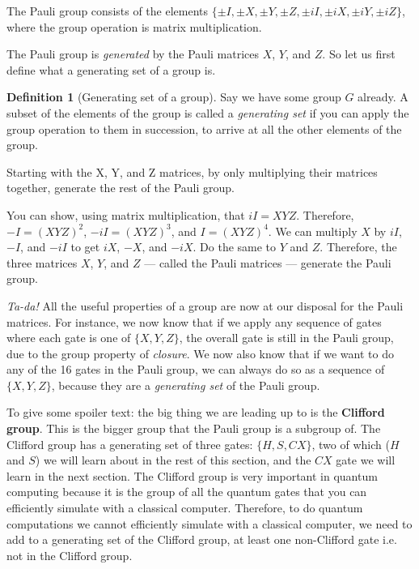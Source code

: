 \documentclass{article}
\theoremstyle{definition}
\newtheorem{definition}{Definition}
\begin{document}
The Pauli group consists of the elements $\{\pm I, \pm X, \pm Y, \pm Z, \pm iI, \pm iX, \pm iY, \pm iZ\}$, where the group operation is matrix multiplication.

The Pauli group is \textit{generated} by the Pauli matrices $X$, $Y$, and $Z$.  So let us first define what a generating set of a group is.
\begin{definition}[Generating set of a group]
	\label{def:generategroup}
	Say we have some group $G$ already.
	A subset of the elements of the group is called a \textit{generating set} if you can apply the group operation to them in succession, to arrive at all the other elements of the group.
\end{definition}

\begin{example}
	\label{ex:generatepauli}
	Starting with the X, Y, and Z matrices, by only multiplying their matrices together, generate the rest of the Pauli group.

	\textnormal{
	You can show, using matrix multiplication, that $iI = X Y Z$.
	Therefore, $-I = (X Y Z)^2$, $-iI = (X Y Z)^3$, and $I = (X Y Z)^4$.
	We can multiply $X$ by $iI$, $-I$, and $-iI$ to get $iX$, $-X$, and $-iX$.
	Do the same to $Y$ and $Z$.
	Therefore, the three matrices $X$, $Y$, and $Z$ --- called the Pauli matrices --- generate the Pauli group.
	}
\end{example}

\textit{Ta-da!}  All the useful properties of a group are now at our disposal for the Pauli matrices.
For instance, we now know that if we apply any sequence of gates where each gate is one of $\{X, Y, Z\}$, the overall gate is still in the Pauli group, due to the group property of \emph{closure}.
We now also know that if we want to do any of the 16 gates in the Pauli group, we can always do so as a sequence of $\{X, Y, Z\}$, because they are a \emph{generating set} of the Pauli group.

\begin{note}
To give some spoiler text: the big thing we are leading up to is the \textbf{Clifford group}.  This is the bigger group that the Pauli group is a subgroup of.  The Clifford group has a generating set of three gates: $\{H, S, CX\}$, two of which ($H$ and $S$) we will learn about in the rest of this section, and the $CX$ gate we will learn in the next section.  The Clifford group is very important in quantum computing because it is the group of all the quantum gates that you can efficiently simulate with a classical computer.  Therefore, to do quantum computations we cannot efficiently simulate with a classical computer, we need to add to a generating set of the Clifford group, at least one non-Clifford gate i.e. not in the Clifford group.
\end{note}
\end{document}
